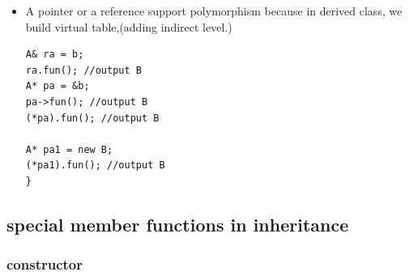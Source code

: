 \documentclass[a4paper,11pt,twoside]{book}
\begin{document}
\begin{itemize}
\item A pointer or a reference support polymorphism because in derived class, we build virtual table,(adding indirect level.)
\begin{lstlisting}
A& ra = b;
ra.fun(); //output B
A* pa = &b;
pa->fun(); //output B
(*pa).fun(); //output B
		
A* pa1 = new B;
(*pa1).fun(); //output B
}
\end{lstlisting}
\end{itemize}

\subsection{special member functions in inheritance}

\subsubsection{constructor}
\end{document}
